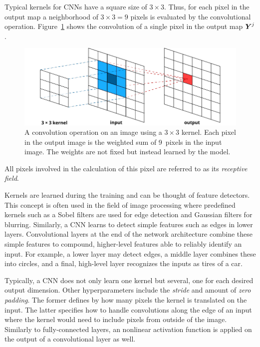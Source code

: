 Typical kernels for CNNs have a square size of $3 \times 3$. Thus, for each pixel in the output map a neighborhood of $3 \times 3 = 9$ pixels is evaluated by the convolutional operation.  Figure~\ref{fig:convolution} shows the convolution of a single pixel in the output map $\boldsymbol{Y}^{j}$.
	\begin{figure}[tp]
  		\centering
    	\includegraphics{img/convolution.pdf}
    	\caption{A convolution operation on an image using a $3 \times 3$ kernel. Each pixel in the output image is the weighted sum of \num{9}~pixels in the input image. The weights are not fixed but instead learned by the model.}
    	\label{fig:convolution}
	\end{figure}
	All pixels involved in the calculation of this pixel are referred to as its \emph{receptive field}. 

Kernels are learned during the training and can be thought of feature detectors. This concept is often used in the field of image processing where predefined kernels such as a Sobel filters are used for edge detection and Gaussian filters for blurring. Similarly, a CNN learns to detect simple features such as edges in lower layers. Convolutional layers at the end of the network architecture combine these simple  features to compound, higher-level features able to reliably identify an input. For example, a lower layer may detect edges, a middle layer combines these into circles, and a final, high-level layer recognizes the inputs as tires of a car.

Typically, a CNN does not only learn one kernel but several, one for each desired output dimension. Other hyperparameters include the \emph{stride} and amount of \emph{zero padding}. The former defines by how many pixels the kernel is translated on the input. The latter specifies how to handle convolutions along the edge of an input where the kernel would need to include pixels from outside of the image. Similarly to fully-connected layers, an nonlinear activation function is applied on the output of a convolutional layer as well.  

